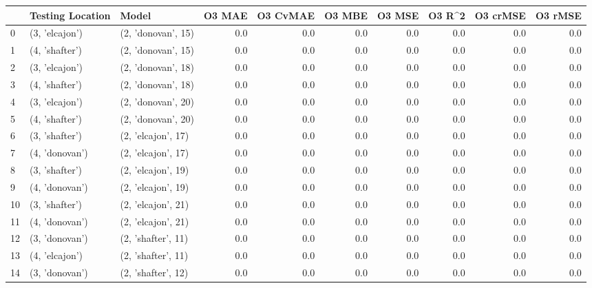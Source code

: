 \begin{tabular}{lllrrrrrrr}
\toprule
{} & Testing Location &               Model &  O3 MAE &  O3 CvMAE &  O3 MBE &  O3 MSE &  O3 R\textasciicircum2 &  O3 crMSE &  O3 rMSE \\
\midrule
0  &   (3, 'elcajon') &  (2, 'donovan', 15) &     0.0 &       0.0 &     0.0 &     0.0 &     0.0 &       0.0 &      0.0 \\
1  &   (4, 'shafter') &  (2, 'donovan', 15) &     0.0 &       0.0 &     0.0 &     0.0 &     0.0 &       0.0 &      0.0 \\
2  &   (3, 'elcajon') &  (2, 'donovan', 18) &     0.0 &       0.0 &     0.0 &     0.0 &     0.0 &       0.0 &      0.0 \\
3  &   (4, 'shafter') &  (2, 'donovan', 18) &     0.0 &       0.0 &     0.0 &     0.0 &     0.0 &       0.0 &      0.0 \\
4  &   (3, 'elcajon') &  (2, 'donovan', 20) &     0.0 &       0.0 &     0.0 &     0.0 &     0.0 &       0.0 &      0.0 \\
5  &   (4, 'shafter') &  (2, 'donovan', 20) &     0.0 &       0.0 &     0.0 &     0.0 &     0.0 &       0.0 &      0.0 \\
6  &   (3, 'shafter') &  (2, 'elcajon', 17) &     0.0 &       0.0 &     0.0 &     0.0 &     0.0 &       0.0 &      0.0 \\
7  &   (4, 'donovan') &  (2, 'elcajon', 17) &     0.0 &       0.0 &     0.0 &     0.0 &     0.0 &       0.0 &      0.0 \\
8  &   (3, 'shafter') &  (2, 'elcajon', 19) &     0.0 &       0.0 &     0.0 &     0.0 &     0.0 &       0.0 &      0.0 \\
9  &   (4, 'donovan') &  (2, 'elcajon', 19) &     0.0 &       0.0 &     0.0 &     0.0 &     0.0 &       0.0 &      0.0 \\
10 &   (3, 'shafter') &  (2, 'elcajon', 21) &     0.0 &       0.0 &     0.0 &     0.0 &     0.0 &       0.0 &      0.0 \\
11 &   (4, 'donovan') &  (2, 'elcajon', 21) &     0.0 &       0.0 &     0.0 &     0.0 &     0.0 &       0.0 &      0.0 \\
12 &   (3, 'donovan') &  (2, 'shafter', 11) &     0.0 &       0.0 &     0.0 &     0.0 &     0.0 &       0.0 &      0.0 \\
13 &   (4, 'elcajon') &  (2, 'shafter', 11) &     0.0 &       0.0 &     0.0 &     0.0 &     0.0 &       0.0 &      0.0 \\
14 &   (3, 'donovan') &  (2, 'shafter', 12) &     0.0 &       0.0 &     0.0 &     0.0 &     0.0 &       0.0 &      0.0 \\

\end{tabular}
